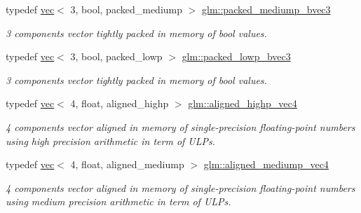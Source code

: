 \begin{DoxyCompactItemize}
\mbox{\label{group__gtc__type__aligned_ga5680ac66be8ba6f8bc6725553d4e8723}} 
typedef \hyperlink{structglm_1_1vec}{vec}$<$ 3, bool, packed\+\_\+mediump $>$ \hyperlink{group__gtc__type__aligned_ga5680ac66be8ba6f8bc6725553d4e8723}{glm\+::packed\+\_\+mediump\+\_\+bvec3}
\begin{DoxyCompactList}\small\item\em 3 components vector tightly packed in memory of bool values. \end{DoxyCompactList}\item 
\mbox{\label{group__gtc__type__aligned_gae995413af4c773ede88dfa5b13a82fab}} 
typedef \hyperlink{structglm_1_1vec}{vec}$<$ 3, bool, packed\+\_\+lowp $>$ \hyperlink{group__gtc__type__aligned_gae995413af4c773ede88dfa5b13a82fab}{glm\+::packed\+\_\+lowp\+\_\+bvec3}
\begin{DoxyCompactList}\small\item\em 3 components vector tightly packed in memory of bool values. \end{DoxyCompactList}\item 
\mbox{\label{group__gtc__type__aligned_ga60d6561b0daa150c617f3a7a277e44ee}} 
typedef \hyperlink{structglm_1_1vec}{vec}$<$ 4, float, aligned\+\_\+highp $>$ \hyperlink{group__gtc__type__aligned_ga60d6561b0daa150c617f3a7a277e44ee}{glm\+::aligned\+\_\+highp\+\_\+vec4}
\begin{DoxyCompactList}\small\item\em 4 components vector aligned in memory of single-\/precision floating-\/point numbers using high precision arithmetic in term of U\+L\+Ps. \end{DoxyCompactList}\item 
\mbox{\label{group__gtc__type__aligned_ga83fa079eb8188b8acb4e90589ce5dddb}} 
typedef \hyperlink{structglm_1_1vec}{vec}$<$ 4, float, aligned\+\_\+mediump $>$ \hyperlink{group__gtc__type__aligned_ga83fa079eb8188b8acb4e90589ce5dddb}{glm\+::aligned\+\_\+mediump\+\_\+vec4}
\begin{DoxyCompactList}\small\item\em 4 components vector aligned in memory of single-\/precision floating-\/point numbers using medium precision arithmetic in term of U\+L\+Ps. \end{DoxyCompactList}\item 

\end{DoxyCompactItemize}
